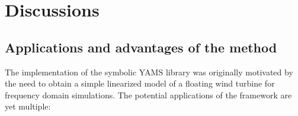 \documentclass[wes, manuscript]{copernicus}
\begin{document}
\section{Discussions}


\subsection{Applications and advantages of the method}
\label{sec:Applications}\label{sec:Advantages}
The implementation of the symbolic YAMS library was originally motivated by the need to obtain a simple linearized model of a floating wind turbine for frequency domain simulations.
The potential applications of the framework are yet multiple:
\end{document}
